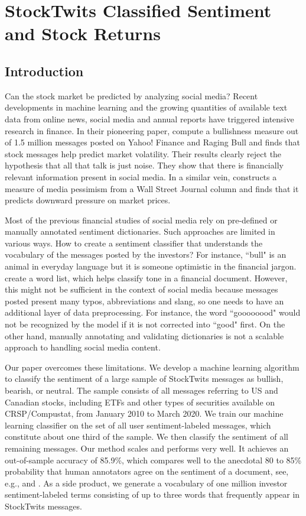 \chapter{StockTwits Classified Sentiment and Stock Returns}

\section{Introduction}
\label{S:3.1}

Can the stock market be predicted by analyzing social media? Recent developments in machine learning and the growing quantities of available text data from online news, social media and annual reports have triggered intensive research in finance. In their pioneering paper, \citet{antweiler2004all} compute a bullishness measure out of 1.5 million messages posted on Yahoo! Finance and Raging Bull and finds that stock messages help predict market volatility. Their results clearly reject the hypothesis that all that talk is just noise. They show that there is financially relevant information present in social media. In a similar vein, \citet{tet_07} constructs a measure of media pessimism from a Wall Street Journal column and finds that it predicts downward pressure on market prices. 

Most of the previous financial studies of social media rely on pre-defined or manually annotated sentiment dictionaries. Such approaches are limited in various ways. How to create a sentiment classifier that understands the vocabulary of the messages posted by the investors? For instance, ``bull" is an animal in everyday language but it is someone optimistic in the financial jargon. \citet{loughran2011liability} create a word list, which helps classify tone in a financial document. However, this might not be sufficient in the context of social media because messages posted present many typos, abbreviations and slang, so one needs to have an additional layer of data preprocessing. For instance, the word ``goooooood" would not be recognized by the model if it is not corrected into ``good" first. On the other hand, manually annotating and validating dictionaries is not a scalable approach to handling social media content.

Our paper overcomes these limitations. We develop a machine learning algorithm to classify the sentiment of a large sample of StockTwits messages as bullish, bearish, or neutral. The sample consists of all messages referring to US and Canadian stocks, including ETFs and other types of securities available on CRSP/Compustat, from January 2010 to March 2020. We train our machine learning classifier on the set of all user sentiment-labeled messages, which constitute about one third of the sample. We then classify the sentiment of all remaining messages. Our method scales and performs very well. It achieves an out-of-sample accuracy of 85.9\%, which compares well to the anecdotal 80 to 85\% probability that human annotators agree on the sentiment of a document, see, e.g., \citet{wilson2005recognizing} and \citet{chen2020large}. As a side product, we generate a vocabulary of one million investor sentiment-labeled terms consisting of up to three words that frequently appear in StockTwits messages.

